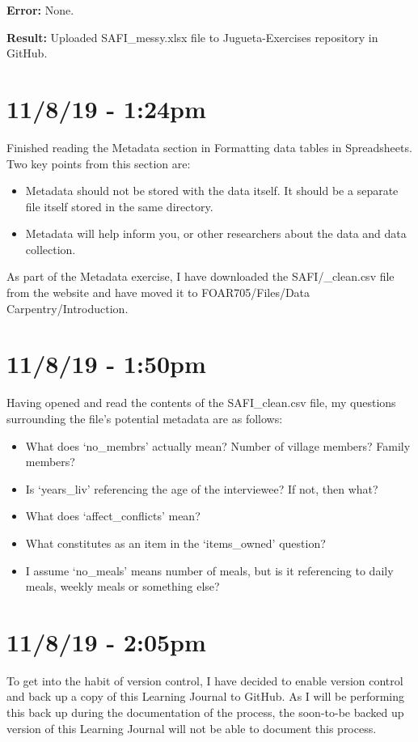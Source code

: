 \documentclass{article}
\begin{document}
\textbf{Error:} None.

\textbf{Result:} Uploaded SAFI\_messy.xlsx file to Jugueta-Exercises repository in GitHub.

\section*{11/8/19 - 1:24pm}

Finished reading the Metadata section in Formatting data tables in Spreadsheets. Two key points from this section are:
\begin{itemize}
    \item Metadata should not be stored with the data itself. It should be a separate file itself stored in the same directory.
    \item Metadata will help inform you, or other researchers about the data and data collection.
\end{itemize}

As part of the Metadata exercise, I have downloaded the SAFI/_clean.csv file from the website and have moved it to FOAR705/Files/Data Carpentry/Introduction.

\section*{11/8/19 - 1:50pm}

Having opened and read the contents of the SAFI\_clean.csv file, my questions surrounding the file’s potential metadata are as follows:
\begin{itemize}
    \item What does ‘no\_membrs’ actually mean? Number of village members? Family members?
    \item Is ‘years\_liv’ referencing the age of the interviewee? If not, then what?
    \item What does ‘affect\_conflicts’ mean?
    \item What constitutes as an item in the ‘items\_owned’ question?
    \item I assume ‘no\_meals’ means number of meals, but is it referencing to daily meals, weekly meals or something else?
\end{itemize}

\section*{11/8/19 - 2:05pm}

To get into the habit of version control, I have decided to enable version control and back up a copy of this Learning Journal to GitHub. As I will be performing this back up during the documentation of the process, the soon-to-be backed up version of this Learning Journal will not be able to document this process.
\end{document}
